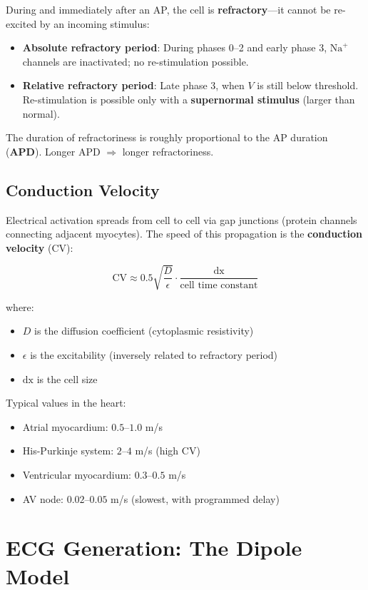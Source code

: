 \documentclass[12pt,a4paper,oneside]{book}
\begin{document}
During and immediately after an AP, the cell is \textbf{refractory}---it cannot be re-excited by an incoming stimulus:

\begin{itemize}
    \item \textbf{Absolute refractory period}: During phases 0--2 and early phase 3, $\text{Na}^+$ channels are inactivated; no re-stimulation possible.
    \item \textbf{Relative refractory period}: Late phase 3, when $V$ is still below threshold. Re-stimulation is possible only with a \textbf{supernormal stimulus} (larger than normal).
\end{itemize}

The duration of refractoriness is roughly proportional to the AP duration (\textbf{APD}). Longer APD $\Rightarrow$ longer refractoriness.

\subsection{Conduction Velocity}

Electrical activation spreads from cell to cell via gap junctions (protein channels connecting adjacent myocytes). The speed of this propagation is the \textbf{conduction velocity} (CV):

$$\text{CV} \approx 0.5 \sqrt{\frac{D}{\epsilon}} \cdot \frac{\text{dx}}{\text{cell time constant}}$$

\noindent where:
\begin{itemize}
    \item $D$ is the diffusion coefficient (cytoplasmic resistivity)
    \item $\epsilon$ is the excitability (inversely related to refractory period)
    \item $\text{dx}$ is the cell size
\end{itemize}

Typical values in the heart:
\begin{itemize}
    \item Atrial myocardium: $0.5$--$1.0$ m/s
    \item His-Purkinje system: $2$--$4$ m/s (high CV)
    \item Ventricular myocardium: $0.3$--$0.5$ m/s
    \item AV node: $0.02$--$0.05$ m/s (slowest, with programmed delay)
\end{itemize}

\section{ECG Generation: The Dipole Model}
\end{document}

